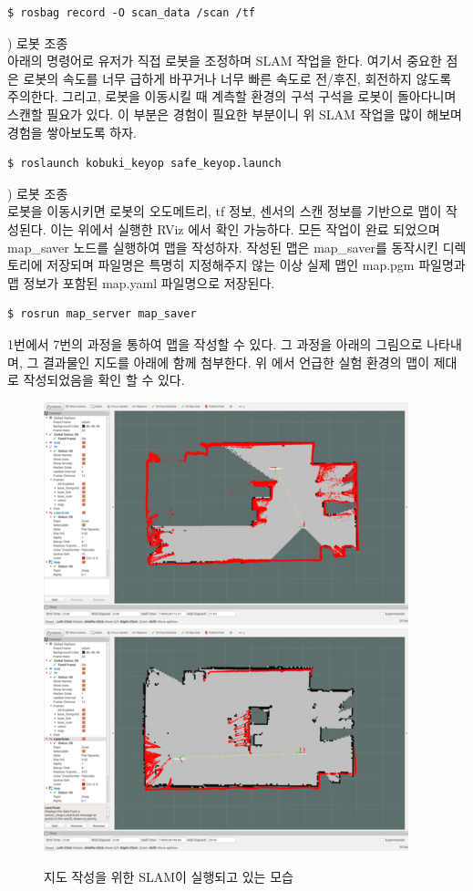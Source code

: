 \vspace{\baselineskip}
\begin{lstlisting}[language=ROS]
$ rosbag record -O scan_data /scan /tf
\end{lstlisting}

\vspace{\baselineskip}
\noindent
{}
\thenum) 로봇 조종\\
아래의 명령어로 유저가 직접 로봇을 조정하며 SLAM 작업을 한다. 여기서 중요한 점은 로봇의 속도를 너무 급하게 바꾸거나 너무 빠른 속도로 전/후진, 회전하지 않도록 주의한다. 그리고, 로봇을 이동시킬 때 계측할 환경의 구석 구석을 로봇이 돌아다니며 스캔할 필요가 있다. 이 부분은 경험이 필요한 부분이니 위 SLAM 작업을 많이 해보며 경험을 쌓아보도록 하자. 

\vspace{\baselineskip}
\begin{lstlisting}[language=ROS]
$ roslaunch kobuki_keyop safe_keyop.launch
\end{lstlisting}

\vspace{\baselineskip}
\noindent
{}
\thenum) 로봇 조종\\
로봇을 이동시키면 로봇의 오도메트리, tf 정보, 센서의 스캔 정보를 기반으로 맵이 작성된다. 이는 위에서 실행한 RViz 에서 확인 가능하다. 모든 작업이 완료 되었으며 map\_saver 노드를 실행하여 맵을 작성하자. 작성된 맵은 map\_saver를 동작시킨 디렉토리에 저장되며 파일명은 특명히 지정해주지 않는 이상 실제 맵인 map.pgm 파일명과 맵 정보가 포함된 map.yaml 파일명으로 저장된다.
\vspace{\baselineskip}
\begin{lstlisting}[language=ROS]
$ rosrun map_server map_saver
\end{lstlisting}

1번에서 7번의 과정을 통하여 맵을 작성할 수 있다. 그 과정을 아래의 그림으로 나타내며, 그 결과물인 지도를 아래에 함께 첨부한다. 위 에서 언급한 실험 환경의 맵이 제대로 작성되었음을 확인 할 수 있다.

\begin{figure}[h]
\centering
\includegraphics[width=0.5\columnwidth]{pictures/chapter11/slamtest1.png}
\includegraphics[width=0.5\columnwidth]{pictures/chapter11/slamtest2.png}
\caption{지도 작성을 위한 SLAM이 실행되고 있는 모습}
\end{figure}

